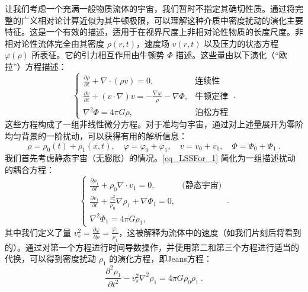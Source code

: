 让我们考虑一个充满一般物质流体的宇宙，我们暂时不指定其确切性质。通过将完整的广义相对论计算近似为其牛顿极限，可以理解这种介质中密度扰动的演化主要特征。这是一个有效的描述，适用于在视界尺度上非相对论性物质的长度尺度。非相对论性流体完全由其密度 \( \rho(r, t) \)，速度场 \( v(r, t) \) 以及压力的状态方程 \( \varphi(\rho) \) 所表征。它的引力相互作用由牛顿势 \( \Phi \) 描述。这些量由以下演化（“欧拉”）方程描述：
\begin{equation}\label{eq_LSSFor_1} \begin{cases} 
\frac{\partial \rho}{\partial t} + \nabla \cdot (\rho v) = 0, & \text{连续性} \\
\frac{\partial v}{\partial t} + (v \cdot \nabla)v = -\frac{\nabla \varphi}{\rho} - \nabla \Phi, & \text{牛顿定律} \\
\nabla^2 \Phi = 4\pi G \rho, & \text{泊松方程}
\end{cases} ~.
\end{equation} 
这些方程构成了一组非线性微分方程。对于准均匀宇宙，通过对上述量展开为零阶均匀背景的一阶扰动，可以获得有用的解析信息：
\begin{equation} 
\rho = \rho_0(t) + \rho_1(x, t), \quad \varphi = \varphi_0 + \varphi_1, \quad v = v_0 + v_1, \quad \Phi = \Phi_0 + \Phi_1~. 
\end{equation}
我们首先考虑静态宇宙（无膨胀）的情况。\autoref{eq_LSSFor_1} 简化为一组描述扰动的耦合方程：
\begin{equation}\label{eq_LSSFor_4}
\begin{cases} 
\frac{\partial \rho_1}{\partial t} + \rho_0 \nabla \cdot v_1 = 0, & \text{(静态宇宙)} \\
\frac{\partial v_1}{\partial t} + \frac{v^2_s}{\rho_0} \nabla \rho_1 + \nabla \Phi_1 = 0, \\
\nabla^2 \Phi_1 = 4\pi G \rho_1,
\end{cases} ~.
\end{equation}
其中我们定义了量 \( v^2_s = \frac{\partial \varphi}{\partial \rho} = \frac{\varphi_1}{\rho_1} \)，这被解释为流体中的速度（如我们片刻后将看到的）。通过对第一个方程进行时间导数操作，并使用第二和第三个方程进行适当的代换，可以得到密度扰动 \( \rho_1 \) 的演化方程，即Jeans方程：
\begin{equation}\label{eq_LSSFor_2}
\frac{\partial^2 \rho_1}{\partial t^2} - v^2_s \nabla^2 \rho_1 = 4\pi G \rho_0 \rho_1~.
\end{equation}
